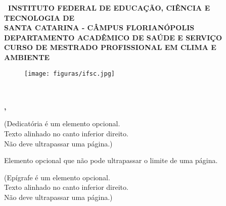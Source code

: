 \documentclass[
	12pt,				%
	openright,			%
	oneside,			%
	a4paper,			%
	english,			%
	french,				%
	spanish,			%
	brazil				%
	]{abntex2}
\newcommand{\imprimirficha}[1]{
    \begin{fichacatalografica}
        
    \end{fichacatalografica}
}
\renewcommand{\ABNTEXchapterfont}{\sffamily}
\renewcommand{\imprimircapa}{
    \begin{capa}
        \begin{SingleSpacing}
            \center
            \ABNTEXchapterfont\bfseries\ INSTITUTO FEDERAL DE EDUCAÇÃO, CIÊNCIA E TECNOLOGIA DE\\SANTA CATARINA - CÂMPUS FLORIANÓPOLIS\\DEPARTAMENTO ACADÊMICO DE SAÚDE E SERVIÇO\\CURSO DE MESTRADO PROFISSIONAL EM CLIMA E AMBIENTE
            
            \vspace*{3.0cm}
            
            \ABNTEXchapterfont\bfseries\imprimirautor
        
            \begin{vplace}[0.5]
                \begin{center}
                    \ABNTEXchapterfont\SingleSpacing\bfseries\imprimirtitulo
                \end{center}
            \end{vplace}
            \begin{figure}[h]
    	\centering
    	\texttt{[image: figuras/ifsc.jpg]}
    \end{figure}
    \\
    \vspace*{2.5cm}
            \begin{center}
                \ABNTEXchapterfont\bfseries\imprimirlocal, \ABNTEXchapterfont\bfseries\imprimirdata
            \end{center}
        \end{SingleSpacing}
    \end{capa}
}
\begin{document}
\frenchspacing 



\imprimircapa

\imprimirfolhaderosto* %

%

\imprimirficha{pdf/fichacatalografica.pdf}






\begin{dedicatoria}
    \vspace*{\fill}
	\begin{flushright}
    		(Dedicatória é um elemento opcional.\\ 
            Texto alinhado no canto inferior direito.\\
            Não deve ultrapassar uma página.)
	\end{flushright}
\end{dedicatoria}




\begin{agradecimentos}
    Elemento opcional que não pode ultrapassar o limite de uma página.
\end{agradecimentos}

\begin{epigrafe}
    \vspace*{\fill}
	\begin{flushright}
    		(Epígrafe é um elemento opcional.\\
    		Texto alinhado no canto inferior direito.\\
            Não deve ultrapassar uma página.)
	\end{flushright}
\end{epigrafe}
\end{document}
